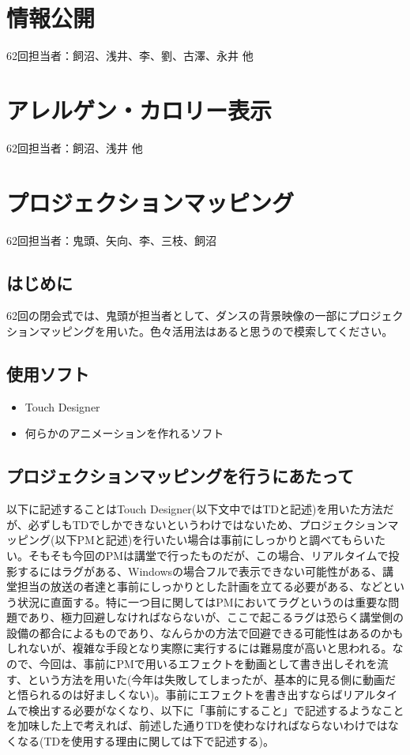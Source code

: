 \documentclass[dvipdfmx,jb5]{jreport}
\begin{document}
\section{情報公開}
62回担当者：飼沼、浅井、李、劉、古澤、永井 他

\section{アレルゲン・カロリー表示}\label{sec:アレルゲン・カロリー表示}
62回担当者：飼沼、浅井 他

\section{プロジェクションマッピング}
62回担当者：鬼頭、矢向、李、三枝、飼沼
\subsection{はじめに}
62回の閉会式では、鬼頭が担当者として、ダンスの背景映像の一部にプロジェクションマッピングを用いた。色々活用法はあると思うので模索してください。

\subsection{使用ソフト}
\begin{itemize}
      \item Touch Designer
      \item 何らかのアニメーションを作れるソフト
\end{itemize}
\subsection{プロジェクションマッピングを行うにあたって}
以下に記述することはTouch Designer(以下文中ではTDと記述)を用いた方法だが、必ずしもTDでしかできないというわけではないため、プロジェクションマッピング(以下PMと記述)を行いたい場合は事前にしっかりと調べてもらいたい。そもそも今回のPMは講堂で行ったものだが、この場合、リアルタイムで投影するにはラグがある、Windowsの場合フルで表示できない可能性がある、講堂担当の放送の者達と事前にしっかりとした計画を立てる必要がある、などという状況に直面する。特に一つ目に関してはPMにおいてラグというのは重要な問題であり、極力回避しなければならないが、ここで起こるラグは恐らく講堂側の設備の都合によるものであり、なんらかの方法で回避できる可能性はあるのかもしれないが、複雑な手段となり実際に実行するには難易度が高いと思われる。なので、今回は、事前にPMで用いるエフェクトを動画として書き出しそれを流す、という方法を用いた(今年は失敗してしまったが、基本的に見る側に動画だと悟られるのは好ましくない)。事前にエフェクトを書き出すならばリアルタイムで検出する必要がなくなり、以下に「事前にすること」で記述するようなことを加味した上で考えれば、前述した通りTDを使わなければならないわけではなくなる(TDを使用する理由に関しては下で記述する)。
\end{document}
